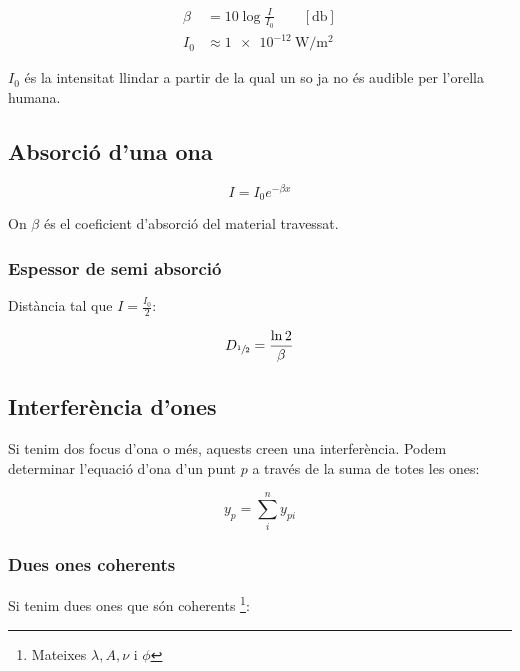 \begin{align}
    \beta &= 10\log \frac{I}{I_0} \qquad [\si{\decibel}]\\
    I_0 &\approx \SI{1e-12}{\watt\per\metre\squared}
\end{align}

$I_0$ és la intensitat llindar a partir de la qual un so ja no és audible per
l'orella humana.

\pagebreak

\subsection{Absorció d'una ona}
\label{sub:absorcio_d_una_ona}

\begin{equation}
    I = I_0 e^{- \beta x}
\end{equation}

On $\beta$ és el coeficient d'absorció del material travessat.

\subsubsection{Espessor de semi absorció}
\label{ssub:espessor_de_semi_absorcio}

Distància tal que $I = \frac{I_0}{2}$:

\begin{equation}
    D_{\sfrac{1}{2}} = \frac{\ln 2}{\beta}
\end{equation}

\subsection{Interferència d'ones}
\label{sub:interferencia_d_ones}

Si tenim dos focus d'ona o més, aquests creen una interferència. Podem determinar
l'equació d'ona d'un punt $p$ a través de la suma de totes les ones:

\begin{equation}
    y_p = \sum_i^n y_{pi}
\end{equation}

\subsubsection{Dues ones coherents}
\label{ssub:dues_ones_coherents}

Si tenim dues ones que són coherents \footnote{Mateixes $\lambda,A,\nu$ i $\phi$}:

